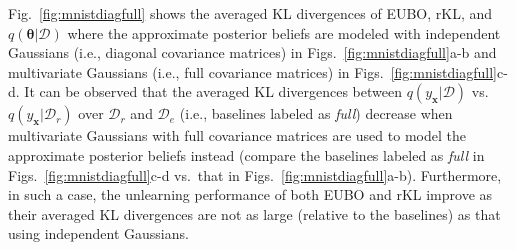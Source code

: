 \documentclass{article}
\theoremstyle{definition}
\newcommand{\mbf}[1]{\mathbf{#1}}
\newcommand{\mcl}[1]{\mathcal{#1}}
\newcommand{\da}{\mcl{D}}
\newcommand{\dc}{\mcl{D}_r}
\newcommand{\dr}{\mcl{D}_e}
\begin{document}
Fig.~\ref{fig:mnistdiagfull} shows the averaged KL divergences of EUBO, rKL, and $q(\bm{\theta}|\da)$ where the approximate posterior beliefs are modeled with independent Gaussians (i.e., diagonal covariance matrices) in Figs.~\ref{fig:mnistdiagfull}a-b and multivariate Gaussians (i.e., full covariance matrices) in Figs.~\ref{fig:mnistdiagfull}c-d. It can be observed that the averaged KL divergences between  $q(y_{\mbf{x}}|\da)$ vs.~$q(y_{\mbf{x}}|\dc)$ over $\dc$ and $\dr$ 
    (i.e., baselines labeled as \emph{full})
decrease when multivariate Gaussians with full covariance matrices are used to model the approximate posterior beliefs instead (compare the baselines labeled as \emph{full} in Figs.~\ref{fig:mnistdiagfull}c-d vs.~that in Figs.~\ref{fig:mnistdiagfull}a-b).
Furthermore, in such a case, the unlearning performance of both EUBO and rKL improve as their averaged KL divergences are not as large (relative to the baselines) as that using independent Gaussians.
%
\end{document}
